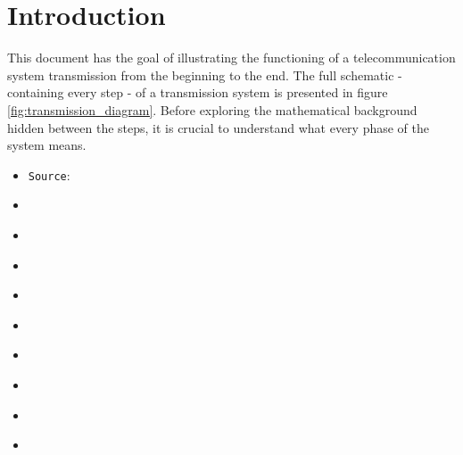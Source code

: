 \section{Introduction}

This document has the goal of illustrating the functioning of a telecommunication system transmission from the beginning to the end. The full schematic - containing every step - of a transmission system is presented in figure \ref{fig:transmission_diagram}. Before exploring the mathematical background hidden between the steps, it is crucial to understand what every phase of the system means.

\begin{itemize}
\renewcommand{\labelitemi}{$\diamond$}
    \item \texttt{Source}: 
    \item \textit{}
    \item \textit{}
    \item \textit{}
    \item \textit{}
    \item \textit{}
    \item \textit{}
    \item \textit{}
    \item \textit{}
    \item \textit{}
\end{itemize}









